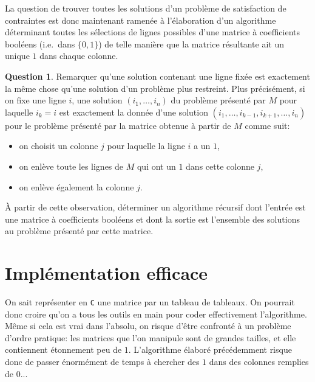 \documentclass[french,a4paper]{article}
\theoremstyle{definition}
\newtheorem{question}{Question}
\theoremstyle{remark}
\begin{document}
La question de trouver toutes les solutions d'un problème de
satisfaction de contraintes est donc maintenant ramenée à
l'élaboration d'un algorithme déterminant toutes les sélections de
lignes possibles d'une matrice à coefficients booléens (i.e.\ dans
$\{0,1\}$) de telle manière que la matrice résultante ait un unique
$1$ dans chaque colonne.

\begin{question}
  \label{question:recursive-matrix}%
  Remarquer qu'une solution contenant une ligne fixée est exactement
  la même chose qu'une solution d'un problème plus restreint. Plus
  précisément, si on fixe une ligne $i$, une solution
  $(i_1,\dots,i_n)$ du problème présenté par $M$ pour laquelle $i_k=i$
  est exactement la donnée d'une solution
  $(i_1,\dots,i_{k-1},i_{k+1},\dots,i_n)$ pour le problème présenté
  par la matrice obtenue à partir de $M$ comme suit:
  \begin{itemize}
  \item on choisit un colonne $j$ pour laquelle la ligne $i$ a un $1$,
  \item on enlève toute les lignes de $M$ qui ont un $1$ dans cette
    colonne $j$,
  \item on enlève également la colonne $j$.
  \end{itemize}

  \`A partir de cette observation, déterminer un algorithme récursif
  dont l'entrée est une matrice à coefficients booléens et dont la
  sortie est l'ensemble des solutions au problème présenté par cette
  matrice.
\end{question}

\section{Implémentation efficace}
\label{sec:dlx}

On sait représenter en {\tt C} une matrice par un tableau de
tableaux. On pourrait donc croire qu'on a tous les outils en main pour
coder effectivement l'algorithme. Même si cela est vrai dans l'absolu,
on risque d'être confronté à un problème d'ordre pratique: les
matrices que l'on manipule sont de grandes tailles, et elle
contiennent étonnement peu de $1$. L'algorithme élaboré précédemment
risque donc de passer énormément de temps à chercher des $1$ dans des
colonnes remplies de $0$...
\end{document}
